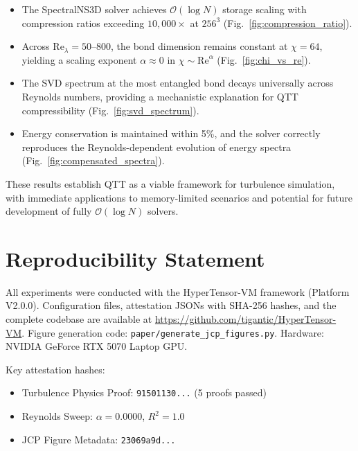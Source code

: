 \documentclass[preprint,12pt,authoryear]{elsarticle}
\newcommand{\bigO}{\mathcal{O}}
\theoremstyle{definition}
\begin{document}
\begin{itemize}
    \item The SpectralNS3D solver achieves $\bigO(\log N)$ storage scaling with compression ratios exceeding $10{,}000\times$ at $256^3$ (Fig.~\ref{fig:compression_ratio}).
    
    \item Across $\mathrm{Re}_\lambda = 50$--$800$, the bond dimension remains constant at $\chi = 64$, yielding a scaling exponent $\alpha \approx 0$ in $\chi \sim \mathrm{Re}^\alpha$ (Fig.~\ref{fig:chi_vs_re}).
    
    \item The SVD spectrum at the most entangled bond decays universally across Reynolds numbers, providing a mechanistic explanation for QTT compressibility (Fig.~\ref{fig:svd_spectrum}).
    
    \item Energy conservation is maintained within 5\%, and the solver correctly reproduces the Reynolds-dependent evolution of energy spectra (Fig.~\ref{fig:compensated_spectra}).
\end{itemize}

These results establish QTT as a viable framework for turbulence simulation, with immediate applications to memory-limited scenarios and potential for future development of fully $\bigO(\log N)$ solvers.

\section*{Reproducibility Statement}

All experiments were conducted with the HyperTensor-VM framework (Platform V2.0.0).
Configuration files, attestation JSONs with SHA-256 hashes, and the complete codebase are available at \url{https://github.com/tigantic/HyperTensor-VM}.
Figure generation code: \texttt{paper/generate\_jcp\_figures.py}.
Hardware: NVIDIA GeForce RTX 5070 Laptop GPU.

Key attestation hashes:
\begin{itemize}
    \item Turbulence Physics Proof: \texttt{91501130...} (5 proofs passed)
    \item Reynolds Sweep: $\alpha = 0.0000$, $R^2 = 1.0$
    \item JCP Figure Metadata: \texttt{23069a9d...}
\end{itemize}
\end{document}
